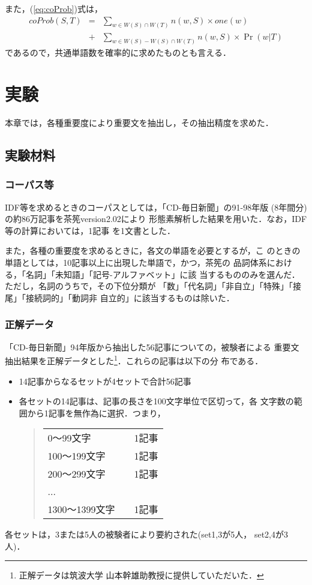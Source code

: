 また，(\ref{eq:coProb})式は，
\begin{eqnarray}
  coProb(S,T) & = & \sum_{w \in W(S) \cap W(T)} n(w,S) \times one(w) \nonumber \\
  & + & \sum_{w \in W(S) - W(S) \cap W(T)} n(w,S) \times \Pr(w|T)\nonumber
\end{eqnarray}
であるので，共通単語数を確率的に求めたものとも言える．

\section{実験}
\label{sec:expriments}

本章では，各種重要度により重要文を抽出し，その抽出精度を求めた．

\subsection{実験材料}
\label{sec:material}

\subsubsection*{コーパス等}

IDF等を求めるときのコーパスとしては，「CD-毎日新聞」の91-98年版
(8年間分)の約86万記事を茶筅version2.02\cite{matsumoto99}により
形態素解析した結果を用いた．なお，IDF等の計算においては，1記事
を1文書とした．

また，各種の重要度を求めるときに，各文の単語を必要とするが，こ
のときの単語としては，10記事以上に出現した単語で，かつ，茶筅の
品詞体系における，「名詞」「未知語」「記号-アルファベット」に該
当するもののみを選んだ．ただし，名詞のうちで，その下位分類が
「数」「代名詞」「非自立」「特殊」「接尾」「接続詞的」「動詞非
自立的」に該当するものは除いた．

\subsubsection*{正解データ}

「CD-毎日新聞」94年版から抽出した56記事についての，被験者による
重要文抽出結果を正解データとした\footnote{正解データは筑波大学
  山本幹雄助教授に提供していただいた．}．これらの記事は以下の分
布である．
\begin{itemize}
\item 14記事からなるセットが4セットで合計56記事
\item 各セットの14記事は、記事の長さを100文字単位で区切って，各
  文字数の範囲から1記事を無作為に選択．つまり，
  \begin{quote}
    \begin{tabular}{ll}
      0〜99文字　     & 1記事\\
      100〜199文字　  & 1記事\\
      200〜299文字　  & 1記事\\
      ...\\
      1300〜1399文字　& 1記事\\
    \end{tabular}
  \end{quote}
\end{itemize}
各セットは，3または5人の被験者により要約された(set1,3が5人，
set2,4が3人)．

